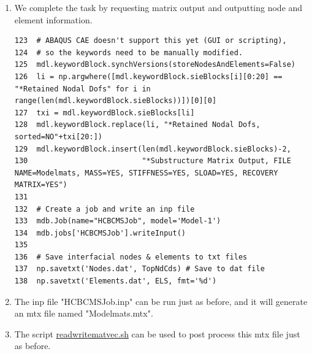 \documentclass[11pt]{article}
\begin{document}
\begin{enumerate}
\item We complete the task by requesting matrix output and outputting node and element information.
\begin{verbatim}
123  # ABAQUS CAE doesn't support this yet (GUI or scripting),
124  # so the keywords need to be manually modified.
125  mdl.keywordBlock.synchVersions(storeNodesAndElements=False)
126  li = np.argwhere([mdl.keywordBlock.sieBlocks[i][0:20] == "*Retained Nodal Dofs" for i in range(len(mdl.keywordBlock.sieBlocks))])[0][0]
127  txi = mdl.keywordBlock.sieBlocks[li]
128  mdl.keywordBlock.replace(li, "*Retained Nodal Dofs, sorted=NO"+txi[20:])
129  mdl.keywordBlock.insert(len(mdl.keywordBlock.sieBlocks)-2, 
130                          "*Substructure Matrix Output, FILE NAME=Modelmats, MASS=YES, STIFFNESS=YES, SLOAD=YES, RECOVERY MATRIX=YES")
131  
132  # Create a job and write an inp file
133  mdb.Job(name="HCBCMSJob", model='Model-1')
134  mdb.jobs['HCBCMSJob'].writeInput()
135  
136  # Save interfacial nodes & elements to txt files
137  np.savetxt('Nodes.dat', TopNdCds) # Save to dat file
138  np.savetxt('Elements.dat', ELS, fmt='%d')
\end{verbatim}
\item The inp file "HCBCMSJob.inp" can be run just as before, and it will generate an mtx file named "Modelmats.mtx".
\item The script \href{https://github.com/Nidish96/Abaqus4Joints/blob/main/scripts/readwritematvec.sh}{readwritematvec.sh} can be used to post process this mtx file just as before.
\end{enumerate}
\end{document}
